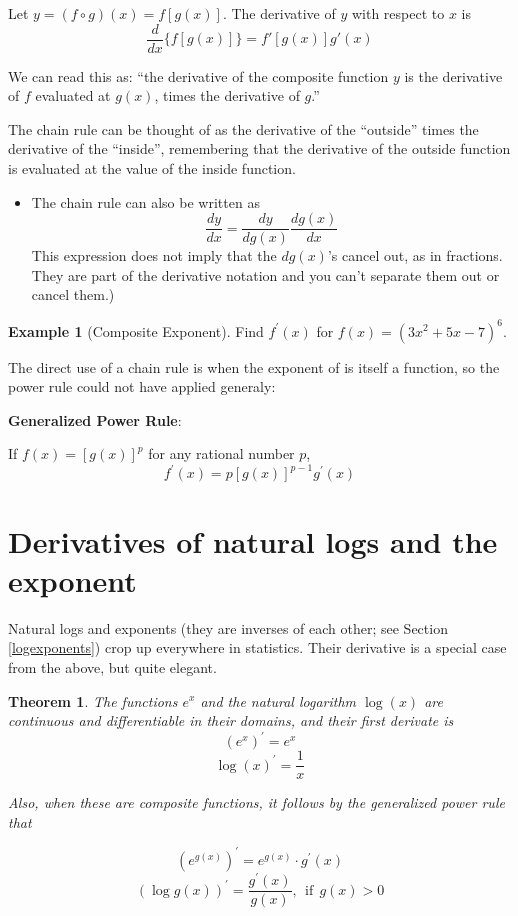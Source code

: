\documentclass[
]{book}
\providecommand{\tightlist}{%
  \setlength{\itemsep}{0pt}\setlength{\parskip}{0pt}}
\newtheorem{theorem}{Theorem}[chapter]
\theoremstyle{definition}
\theoremstyle{definition}
\newtheorem{example}{Example}[chapter]
\theoremstyle{definition}
\theoremstyle{remark}
\begin{document}
Let \(y=(f\circ g)(x)= f[g(x)]\). The derivative of \(y\) with respect to \(x\) is \[\frac{d}{dx} \{ f[g(x)] \} = f'[g(x)] g'(x)\]

We can read this as: ``the derivative of the composite function \(y\) is the derivative of \(f\) evaluated at \(g(x)\), times the derivative of \(g\).''

The chain rule can be thought of as the derivative of the ``outside'' times the derivative of the ``inside'', remembering that the derivative of the outside function is evaluated at the value of the inside function.

\begin{itemize}
\tightlist
\item
  The chain rule can also be written as \[\frac{dy}{dx}=\frac{dy}{dg(x)} \frac{dg(x)}{dx}\] This expression does not imply that the \(dg(x)\)'s cancel out, as in fractions. They are part of the derivative notation and you can't separate them out or cancel them.)
\end{itemize}

\begin{example}[Composite Exponent]
\protect\hypertarget{exm:tothesix}{}{\label{exm:tothesix} {} }Find \(f^\prime(x)\) for \(f(x) = (3x^2+5x-7)^6\).
\end{example}

The direct use of a chain rule is when the exponent of is itself a function, so the power rule could not have applied generaly:

\textbf{Generalized Power Rule}:

If \(f(x)=[g(x)]^p\) for any rational number \(p\), \[f^\prime(x) =p[g(x)]^{p-1}g^\prime(x)\]

\hypertarget{derivatives-of-natural-logs-and-the-exponent}{%
\section{Derivatives of natural logs and the exponent}\label{derivatives-of-natural-logs-and-the-exponent}}

Natural logs and exponents (they are inverses of each other; see Section \ref{logexponents}) crop up everywhere in statistics. Their derivative is a special case from the above, but quite elegant.

\begin{theorem}
\protect\hypertarget{thm:derivexplog}{}{\label{thm:derivexplog} }
The functions \(e^x\) and the natural logarithm \(\log(x)\) are continuous and differentiable in their domains, and their first derivate is
\[(e^x)^\prime = e^x\]
\[\log(x)^\prime = \frac{1}{x}\]

Also, when these are composite functions, it follows by the generalized power rule that

\[\left(e^{g(x)}\right)^\prime = e^{g(x)} \cdot g^\prime(x)\]
\[\left(\log g(x)\right)^\prime = \frac{g^\prime(x)}{g(x)}, ~~\text{if}~~ g(x) > 0\]
\end{theorem}
\end{document}
